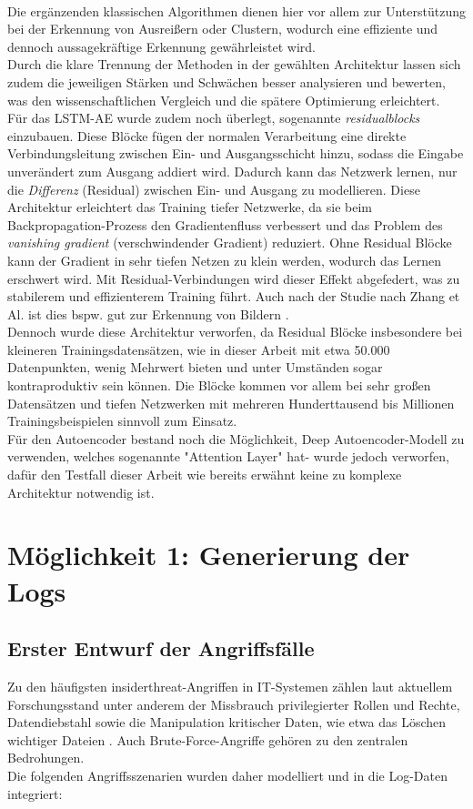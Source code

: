 \documentclass[a4paper,12pt]{article}
\begin{document}
	\\[0.5em]
	Die ergänzenden klassischen Algorithmen dienen hier vor allem zur Unterstützung bei der Erkennung von Ausreißern oder Clustern, wodurch eine effiziente und dennoch aussagekräftige Erkennung gewährleistet wird.
	\\[0.5em]
	Durch die klare Trennung der Methoden in der gewählten Architektur lassen sich zudem die jeweiligen Stärken und Schwächen besser analysieren und bewerten, was den wissenschaftlichen Vergleich und die spätere Optimierung erleichtert.
	\\[0.5em]
	Für das LSTM-AE wurde zudem noch überlegt, sogenannte \textit{\gls{residualblock}s} einzubauen. Diese Blöcke fügen der normalen Verarbeitung eine direkte Verbindungsleitung zwischen Ein- und Ausgangsschicht hinzu, sodass die Eingabe unverändert zum Ausgang addiert wird. Dadurch kann das Netzwerk lernen, nur die \textit{Differenz} (Residual) zwischen Ein- und Ausgang zu modellieren. Diese Architektur erleichtert das Training tiefer Netzwerke, da sie beim Backpropagation-Prozess den Gradientenfluss verbessert und das Problem des \textit{vanishing gradient} (verschwindender Gradient) reduziert. Ohne Residual Blöcke kann der Gradient in sehr tiefen Netzen zu klein werden, wodurch das Lernen erschwert wird. Mit Residual-Verbindungen wird dieser Effekt abgefedert, was zu stabilerem und effizienterem Training führt. Auch nach der Studie nach Zhang et Al. ist dies bspw. gut zur Erkennung von Bildern \cite{he2016deep}.
	\\[0.5em]
	Dennoch wurde diese Architektur verworfen, da Residual Blöcke insbesondere bei kleineren Trainingsdatensätzen, wie in dieser Arbeit mit etwa 50.000 Datenpunkten, wenig Mehrwert bieten und unter Umständen sogar kontraproduktiv sein können. Die Blöcke kommen vor allem bei sehr großen Datensätzen und tiefen Netzwerken mit mehreren Hunderttausend bis Millionen Trainingsbeispielen sinnvoll zum Einsatz.
	\\[0.5em]
	Für den Autoencoder bestand noch die Möglichkeit, Deep Autoencoder-Modell zu verwenden, welches sogenannte "Attention Layer" \cite{najafi2023attention} hat- wurde jedoch verworfen, dafür den Testfall dieser Arbeit wie bereits erwähnt keine zu komplexe Architektur notwendig ist.

	\section{Möglichkeit 1: Generierung der Logs}
	\subsection{Erster Entwurf der Angriffsfälle}
	Zu den häufigsten \gls{insiderthreat}-Angriffen in IT-Systemen zählen laut aktuellem Forschungsstand unter anderem der Missbrauch privilegierter Rollen und Rechte, Datendiebstahl sowie die Manipulation kritischer Daten, wie etwa das Löschen wichtiger Dateien \cite[S.6]{singh2022insiderthreats}. Auch Brute-Force-Angriffe gehören zu den zentralen Bedrohungen.
	\\[0.5em]
	Die folgenden Angriffsszenarien wurden daher modelliert und in die Log-Daten integriert:
	
\end{document}
